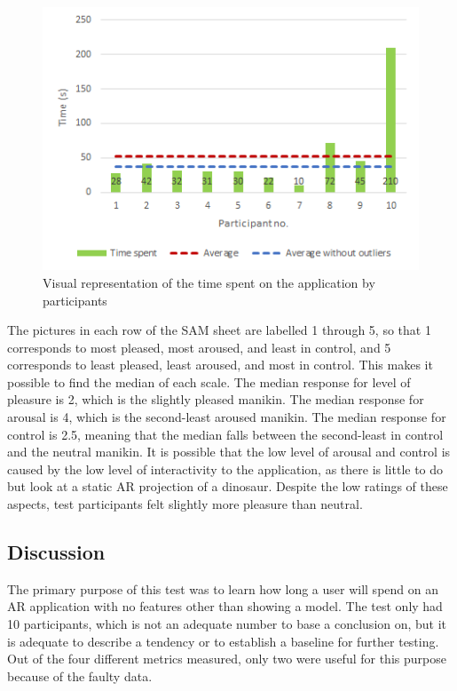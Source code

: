 \begin{figure}[h!]
    \centering
    \includegraphics[scale=0.7]{figures/time_graph.png}
    \caption{Visual representation of the time spent on the application by participants}\label{fig:time_graph}
\end{figure}

The pictures in each row of the SAM sheet are labelled 1 through 5, so that 1 corresponds to most pleased, most aroused, and least in control, and 5 corresponds to least pleased, least aroused, and most in control. This makes it possible to find the median of each scale. The median response for level of pleasure is 2, which is the slightly pleased manikin. The median response for arousal is 4, which is the second-least aroused manikin. The median response for control is 2.5, meaning that the median falls between the second-least in control and the neutral manikin. It is possible that the low level of arousal and control is caused by the low level of interactivity to the application, as there is little to do but look at a static AR projection of a dinosaur. Despite the low ratings of these aspects, test participants felt slightly more pleasure than neutral. 

\subsection{Discussion}
The primary purpose of this test was to learn how long a user will spend on an AR application with no features other than showing a model. The test only had 10 participants, which is not an adequate number to base a conclusion on, but it is adequate to describe a tendency or to establish a baseline for further testing. Out of the four different metrics measured, only two were useful for this purpose because of the faulty data. 

